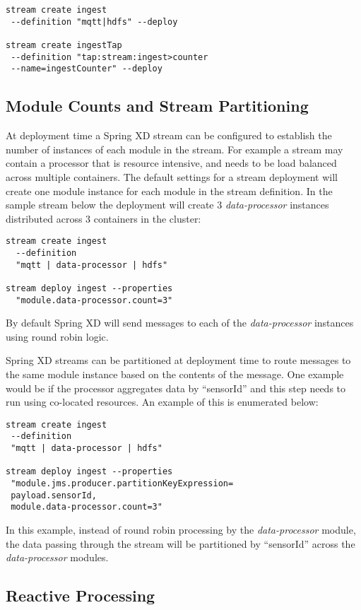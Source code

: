 \begin{lstlisting}
stream create ingest
 --definition "mqtt|hdfs" --deploy

stream create ingestTap
 --definition "tap:stream:ingest>counter
 --name=ingestCounter" --deploy
\end{lstlisting}

\subsection {Module Counts and Stream Partitioning}
At deployment time a Spring XD stream can be configured to establish the number
of instances of each module in the stream. For example a stream may contain
a processor that is resource intensive, and needs to be
load balanced across multiple containers. The default
settings for a stream deployment will create one module instance for each
module in the stream definition. In the sample stream below the
deployment will create 3 \emph{data-processor} instances distributed
across 3 containers in the cluster:

\begin{lstlisting}
stream create ingest
  --definition
  "mqtt | data-processor | hdfs"

stream deploy ingest --properties
  "module.data-processor.count=3"
\end{lstlisting}

By default Spring XD will send messages to each of the \emph{data-processor}
instances using round robin logic.

Spring XD streams can be partitioned at deployment time to route messages to the
same module instance based on the contents of the message. One example
would be if the processor aggregates data by ``sensorId'' and this step needs to
run using co-located resources.  An example of this is enumerated below:

\begin{lstlisting}
stream create ingest
 --definition
 "mqtt | data-processor | hdfs"

stream deploy ingest --properties
 "module.jms.producer.partitionKeyExpression=
 payload.sensorId,
 module.data-processor.count=3"
\end{lstlisting}

In this example, instead of round robin processing by the \emph{data-processor}
module, the data passing through the stream will be partitioned by ``sensorId''
across the \emph{data-processor} modules.

\subsection {Reactive Processing}


